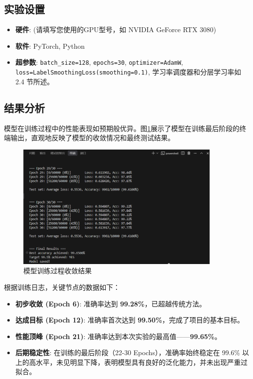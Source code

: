 \documentclass[UTF8]{ctexart}
\begin{document}
\subsection{实验设置}

\begin{itemize}
    \item \textbf{硬件}: (请填写您使用的GPU型号，如 NVIDIA GeForce RTX 3080)
    \item \textbf{软件}: PyTorch, Python
    \item \textbf{超参数}: \texttt{batch\_size=128}, \texttt{epochs=30}, \texttt{optimizer=AdamW}, \texttt{loss=LabelSmoothingLoss(smoothing=0.1)}, 学习率调度器和分层学习率如 2.4 节所述。
\end{itemize}

\subsection{结果分析}

模型在训练过程中的性能表现如预期般优异。图\ref{fig:result}展示了模型在训练最后阶段的终端输出，直观地反映了模型的收敛情况和最终测试结果。

\begin{figure}[h!]
    \centering
    \includegraphics[width=0.9\textwidth]{result.png}
    \caption{模型训练过程收敛结果}
    \label{fig:result}
\end{figure}

根据训练日志，关键节点的数据如下：

\begin{itemize}
    \item \textbf{初步收敛 (Epoch 6)}: 准确率达到 \textbf{99.28\%}，已超越传统方法。
    \item \textbf{达成目标 (Epoch 12)}: 准确率首次达到 \textbf{99.50\%}，完成了项目的基本目标。
    \item \textbf{性能顶峰 (Epoch 21)}: 准确率达到本次实验的最高值——\textbf{99.65\%}。
    \item \textbf{后期稳定性}: 在训练的最后阶段（22-30 Epochs），准确率始终稳定在 99.6\% 以上的高水平，未见明显下降，表明模型具有良好的泛化能力，并未出现严重过拟合。
\end{itemize}
\end{document}
